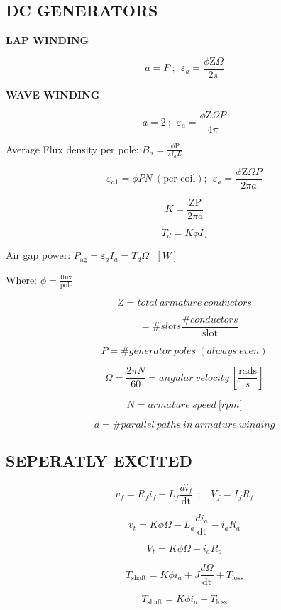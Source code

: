 \begin{multicols}{2}
	\subsection{DC GENERATORS}
	
	\textbf{LAP WINDING}
	
	\[a = P\ ;\ \ \varepsilon_{a} = \frac{\phi\text{Z}\Omega}{2\pi}\]
	
	\textbf{WAVE WINDING}
	
	\[a = 2\ ;\ \ \varepsilon_{a} = \frac{\phi\text{Z}\Omega P}{4\pi}\]
	
	Average Flux density per pole: \(B_{a} = \frac{\phi \text{P}}{\pi l_{a}D}\)
	
	\[\varepsilon_{a1} = \phi PN\ \left( \text{per\ coil} \right);\ \ \varepsilon_{a} = \frac{\phi\text{Z}\Omega P}{2\pi a}\]
	
	\[K = \frac{\text{ZP}}{2\pi a}\]
	
	\[T_{d} = K\phi I_{a}\]
	
	Air gap power:
	\(P_{\text{ag}} = \varepsilon_{a}I_{a} = T_{d}\Omega\text{\ \ }\left\lbrack W \right\rbrack\)
	
	Where: \(\phi = \frac{\text{flux}}{\text{pole}}\)
	
	\[Z = total\ armature\ conductors\]
	
	\[\ \ \ \  = \# slots\frac{\# conductors}{\text{slot}}\]
	
	\[P = \# generator\ poles\ (always\ even)\]
	
	\[\Omega = \frac{2\pi N}{60} = angular\ velocity\ \left\lbrack \frac{\text{rads}}{s} \right\rbrack\]
	
	\[N = armature\ speed\ \lbrack rpm\rbrack\]
	
	\[a = \# parallel\ paths\ in\ armature\ winding\]
	
	\subsection{SEPERATLY EXCITED}
	
	\[v_{f} = R_{f}i_{f} + L_{f}\frac{di_{f}}{\text{dt}}\ \ ;\ \ \ \ V_{f} = I_{f}R_{f}\]
	
	\[v_{t} = K\phi\Omega - L_{a}\frac{di_{a}}{\text{dt}} - i_{a}R_{a}\]
	
	\[V_{t} = K\phi\Omega - i_{a}R_{a}\]
	
	\[T_{\text{shaft}} = K\phi i_{a} + J\frac{d\Omega}{\text{dt}} + T_{\text{loss}}\]
	
	\[T_{\text{shaft}} = K\phi i_{a} + T_{\text{loss}}\]
	

\end{multicols}
